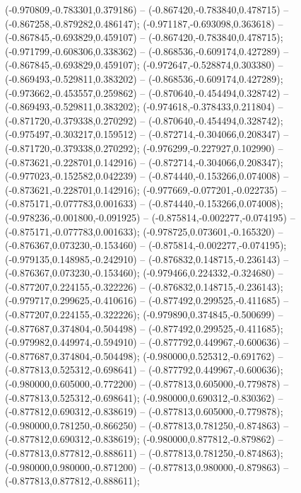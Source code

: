  (-0.970809,-0.783301,0.379186) -- (-0.867420,-0.783840,0.478715) -- (-0.867258,-0.879282,0.486147);
 (-0.971187,-0.693098,0.363618) -- (-0.867845,-0.693829,0.459107) -- (-0.867420,-0.783840,0.478715);
 (-0.971799,-0.608306,0.338362) -- (-0.868536,-0.609174,0.427289) -- (-0.867845,-0.693829,0.459107);
 (-0.972647,-0.528874,0.303380) -- (-0.869493,-0.529811,0.383202) -- (-0.868536,-0.609174,0.427289);
 (-0.973662,-0.453557,0.259862) -- (-0.870640,-0.454494,0.328742) -- (-0.869493,-0.529811,0.383202);
 (-0.974618,-0.378433,0.211804) -- (-0.871720,-0.379338,0.270292) -- (-0.870640,-0.454494,0.328742);
 (-0.975497,-0.303217,0.159512) -- (-0.872714,-0.304066,0.208347) -- (-0.871720,-0.379338,0.270292);
 (-0.976299,-0.227927,0.102990) -- (-0.873621,-0.228701,0.142916) -- (-0.872714,-0.304066,0.208347);
 (-0.977023,-0.152582,0.042239) -- (-0.874440,-0.153266,0.074008) -- (-0.873621,-0.228701,0.142916);
 (-0.977669,-0.077201,-0.022735) -- (-0.875171,-0.077783,0.001633) -- (-0.874440,-0.153266,0.074008);
 (-0.978236,-0.001800,-0.091925) -- (-0.875814,-0.002277,-0.074195) -- (-0.875171,-0.077783,0.001633);
 (-0.978725,0.073601,-0.165320) -- (-0.876367,0.073230,-0.153460) -- (-0.875814,-0.002277,-0.074195);
 (-0.979135,0.148985,-0.242910) -- (-0.876832,0.148715,-0.236143) -- (-0.876367,0.073230,-0.153460);
 (-0.979466,0.224332,-0.324680) -- (-0.877207,0.224155,-0.322226) -- (-0.876832,0.148715,-0.236143);
 (-0.979717,0.299625,-0.410616) -- (-0.877492,0.299525,-0.411685) -- (-0.877207,0.224155,-0.322226);
 (-0.979890,0.374845,-0.500699) -- (-0.877687,0.374804,-0.504498) -- (-0.877492,0.299525,-0.411685);
 (-0.979982,0.449974,-0.594910) -- (-0.877792,0.449967,-0.600636) -- (-0.877687,0.374804,-0.504498);
 (-0.980000,0.525312,-0.691762) -- (-0.877813,0.525312,-0.698641) -- (-0.877792,0.449967,-0.600636);
 (-0.980000,0.605000,-0.772200) -- (-0.877813,0.605000,-0.779878) -- (-0.877813,0.525312,-0.698641);
 (-0.980000,0.690312,-0.830362) -- (-0.877812,0.690312,-0.838619) -- (-0.877813,0.605000,-0.779878);
 (-0.980000,0.781250,-0.866250) -- (-0.877813,0.781250,-0.874863) -- (-0.877812,0.690312,-0.838619);
 (-0.980000,0.877812,-0.879862) -- (-0.877813,0.877812,-0.888611) -- (-0.877813,0.781250,-0.874863);
 (-0.980000,0.980000,-0.871200) -- (-0.877813,0.980000,-0.879863) -- (-0.877813,0.877812,-0.888611);
